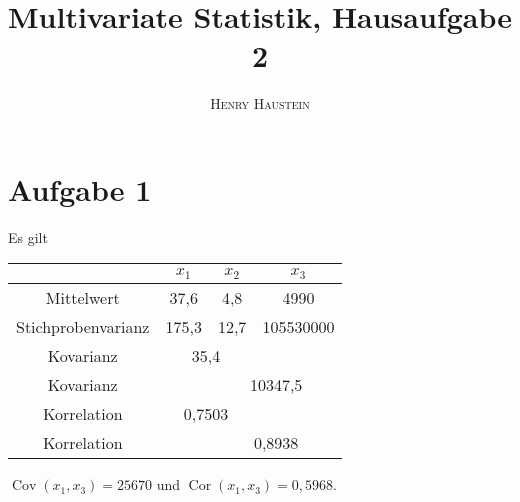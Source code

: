 \documentclass{article}
\title{\textbf{Multivariate Statistik, Hausaufgabe 2}}
\author{\textsc{Henry Haustein}}
\date{}
\DeclareMathOperator{\Cov}{Cov}
\DeclareMathOperator{\Cor}{Cor}
\begin{document}
	\maketitle
	
	\section*{Aufgabe 1}
	Es gilt
	\begin{center}
		\begin{tabular}{c|c|c|c}
			& $x_1$ & $x_2$ & $x_3$ \\
			\hline
			Mittelwert & 37,6 & 4,8 & 4990 \\
			\hline
			Stichprobenvarianz & 175,3 & 12,7 & 105530000 \\
			\hline
			Kovarianz & \multicolumn{2}{c|}{35,4} & \\
			\cline{2-4}
			Kovarianz & & \multicolumn{2}{c}{10347,5} \\
			\hline
			Korrelation & \multicolumn{2}{c|}{0,7503} & \\
			\cline{2-4}
			Korrelation & & \multicolumn{2}{c}{0,8938}
		\end{tabular}
	\end{center}
	$\Cov(x_1,x_3)=25670$ und $\Cor(x_1,x_3)=0,5968$.	
	
\end{document}
